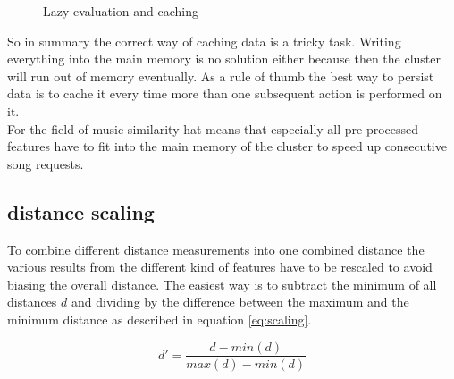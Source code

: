 \begin{figure}[htbp]
	\centering
	\caption{Lazy evaluation and caching}
	\label{lazcach}
\end{figure}
\FloatBarrier

\noindent So in summary the correct way of caching data is a tricky task. Writing everything into the main memory is no solution either because then the cluster will run out of memory eventually. As a rule of thumb the best way to persist data is to cache it every time more than one subsequent action is performed on it.\\
For the field of music similarity hat means that especially all pre-processed features have to fit into the main memory of the cluster to speed up consecutive song requests. 

\subsection{distance scaling}\label{distsc}

To combine different distance measurements into one combined distance the various results from the different kind of features have to be rescaled to avoid biasing the overall distance.
The easiest way is to subtract the minimum of all distances $d$ and dividing by the difference between the maximum and the minimum distance as described in equation \ref{eq:scaling}. 

\begin{equation} \label{eq:scaling}
d' = \frac{d - min(d)}{max(d) - min(d)}
\end{equation}

